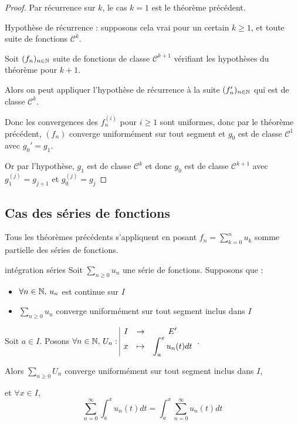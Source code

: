 
\begin{proof}
    Par récurrence sur $k$, le cas $k = 1$ est le théorème précédent.

    Hypothèse de récurrence : supposons cela vrai pour un certain $k \geqslant 1$, et toute 
    suite de fonctions $\mathscr C^k$. 

    Soit $(f_n)_{n \in \mathbb{N}}$ suite de fonctions de classe $\mathscr{C}^{k + 1}$ vérifiant les hypothèses du théorème pour $k + 1$.

    Alors on peut appliquer l'hypothèse de récurrence à la suite $(f_n')_{n \in \mathbb{N}}$ qui est de classe $\mathscr{C}^k$.

    Donc les convergences des $f_n^{(i)}$ pour $i \geqslant 1$ sont uniformes, donc 
    par le théorème précédent, $(f_n)$ converge uniformément sur tout segment et 
    $g_0$ est de classe $\mathscr{C}^1$ avec $g_0' = g_1$. 

    Or par l'hypothèse, $g_1$ est de classe $\mathscr{C}^k$ et donc $g_0$ est de classe $\mathscr{C}^{k + 1}$ avec
    $g_1^{(j)} = g_{j + 1}$ et $g_0^{(j)} = g_j$ 
\end{proof}

\subsection{Cas des séries de fonctions }

Tous les théorèmes précédents s'appliquent en posant $\displaystyle f_n = \sum_{k = 0}^n u_k$ somme partielle des 
séries de fonctions.

\begin{theoreme}{intégration séries}{}
    Soit $\sum_{n \geqslant 0} u_n$ une série de fonctions. Supposons que : 
    \begin{itemize}
        \item $\forall n \in \mathbb{N}, \, u_n$ est continue sur $I$
        \item $\sum_{n \geqslant 0} u_n$ converge uniformément 
    sur tout segment inclus dans $I$
    \end{itemize}
    Soit $a \in I$. Posons $\forall n \in \mathbb{N}, \, U_n: \space \begin{array}{|ccc} \displaystyle I & \to & \displaystyle E' \\ \displaystyle x & \mapsto & \displaystyle \int_a^x u_n(t) dt \end{array}$.

    Alors $\sum_{n \geqslant 0} U_n$ converge uniformément sur tout segment inclus dans $I$, 
    
    et 
    $\forall x \in I$, 
    $$\sum_{n = 0 }^{ \infty } \int_{a }^{x } u_n(t) dt = \int_{a}^{x } \sum_{n = 0}^{\infty} u_n(t) dt$$
\end{theoreme}

